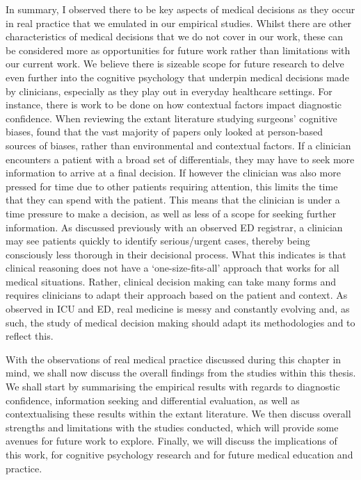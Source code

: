 \documentclass[a4paper, nobind]{templates/ociamthesis}
\begin{document}
\hfill\break
In summary, I observed there to be key aspects of medical decisions as they occur in real practice that we emulated in our empirical studies. Whilst there are other characteristics of medical decisions that we do not cover in our work, these can be considered more as opportunities for future work rather than limitations with our current work. We believe there is sizeable scope for future research to delve even further into the cognitive psychology that underpin medical decisions made by clinicians, especially as they play out in everyday healthcare settings. For instance, there is work to be done on how contextual factors impact diagnostic confidence. When reviewing the extant literature studying surgeons' cognitive biases, \autocite{armstrong_cognitive_2023} found that the vast majority of papers only looked at person-based sources of biases, rather than environmental and contextual factors. If a clinician encounters a patient with a broad set of differentials, they may have to seek more information to arrive at a final decision. If however the clinician was also more pressed for time due to other patients requiring attention, this limits the time that they can spend with the patient. This means that the clinician is under a time pressure to make a decision, as well as less of a scope for seeking further information. As discussed previously with an observed ED registrar, a clinician may see patients quickly to identify serious/urgent cases, thereby being consciously less thorough in their decisional process. What this indicates is that clinical reasoning does not have a `one-size-fits-all' approach that works for all medical situations. Rather, clinical decision making can take many forms and requires clinicians to adapt their approach based on the patient and context. As observed in ICU and ED, real medicine is messy and constantly evolving and, as such, the study of medical decision making should adapt its methodologies and to reflect this.

\hfill\break
With the observations of real medical practice discussed during this chapter in mind, we shall now discuss the overall findings from the studies within this thesis. We shall start by summarising the empirical results with regards to diagnostic confidence, information seeking and differential evaluation, as well as contextualising these results within the extant literature. We then discuss overall strengths and limitations with the studies conducted, which will provide some avenues for future work to explore. Finally, we will discuss the implications of this work, for cognitive psychology research and for future medical education and practice.

\setlength{\baselineskip}{0pt} %

{\renewcommand*\MakeUppercase[1]{#1}%
\printbibliography[heading=none]}
\end{document}
